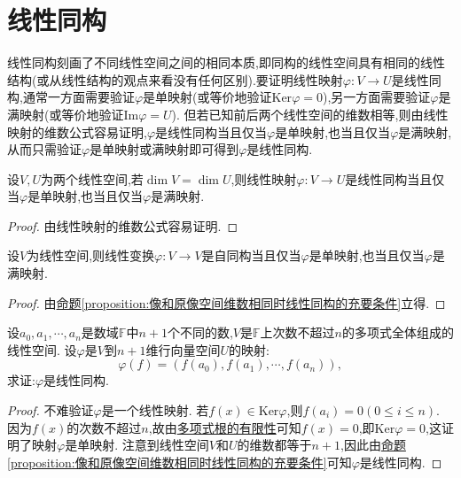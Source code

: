 \documentclass[lang=cn,newtx,10pt,scheme=chinese]{elegantbook}
\begin{document}
\section{线性同构}
线性同构刻画了不同线性空间之间的相同本质,即同构的线性空间具有相同的线性结构(或从线性结构的观点来看没有任何区别).要证明线性映射\(\varphi:V\to U\)是线性同构,通常一方面需要验证\(\varphi\)是单映射(或等价地验证\(\text{Ker}\varphi = 0\)),另一方面需要验证\(\varphi\)是满映射(或等价地验证\(\text{Im}\varphi = U\)). 但若已知前后两个线性空间的维数相等,则由线性映射的维数公式容易证明,\(\varphi\)是线性同构当且仅当\(\varphi\)是单映射,也当且仅当\(\varphi\)是满映射,从而只需验证\(\varphi\)是单映射或满映射即可得到\(\varphi\)是线性同构.

\begin{proposition}\label{proposition:像和原像空间维数相同时线性同构的充要条件}
设$V,U$为两个线性空间,若\(\dim V = \dim U\),则线性映射\(\varphi:V\rightarrow U\)是线性同构当且仅当\(\varphi\)是单映射,也当且仅当\(\varphi\)是满映射.
\end{proposition}
\begin{proof}
    由线性映射的维数公式容易证明.
\end{proof}

\begin{corollary}\label{corollary:线性变换自同构的充要条件}
    设$V$为线性空间,则线性变换\(\varphi:V\rightarrow V\)是自同构当且仅当\(\varphi\)是单映射,也当且仅当\(\varphi\)是满映射.
\end{corollary}
\begin{proof}
    由\hyperref[proposition:像和原像空间维数相同时线性同构的充要条件]{命题\ref{proposition:像和原像空间维数相同时线性同构的充要条件}}立得.
\end{proof}

\begin{lemma}\label{lemma:证明Lagrange插值公式}
设\(a_0,a_1,\cdots,a_n\)是数域\(\mathbb{F}\)中\(n + 1\)个不同的数,\(V\)是\(\mathbb{F}\)上次数不超过\(n\)的多项式全体组成的线性空间. 设\(\varphi\)是\(V\)到\(n + 1\)维行向量空间\(U\)的映射:
\[
\varphi(f)=(f(a_0),f(a_1),\cdots,f(a_n)),
\]
求证:\(\varphi\)是线性同构.
\end{lemma}
\begin{proof}
不难验证\(\varphi\)是一个线性映射. 若\(f(x)\in\text{Ker}\varphi\),则\(f(a_i)=0(0\leq i\leq n)\). 因为\(f(x)\)的次数不超过\(n\),故由\hyperref[proposition:多项式根的有限性]{多项式根的有限性}可知\(f(x)=0\),即\(\text{Ker}\varphi = 0\),这证明了映射\(\varphi\)是单映射. 注意到线性空间\(V\)和\(U\)的维数都等于\(n + 1\),因此由\hyperref[proposition:像和原像空间维数相同时线性同构的充要条件]{命题\ref{proposition:像和原像空间维数相同时线性同构的充要条件}}可知\(\varphi\)是线性同构.
\end{proof}
\end{document}
